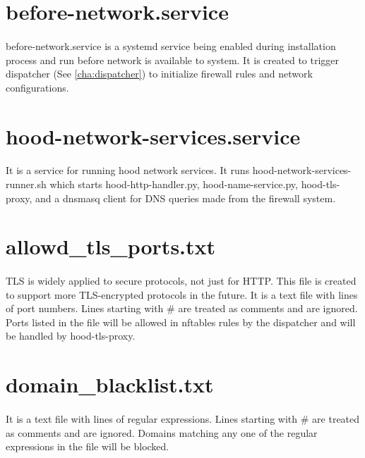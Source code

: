\documentclass[mscthesis]{usiinfthesis}
\begin{document}
\section{before-network.service}\label{sec:before-network-service}
\paragraph{}
before-network.service is a systemd service being enabled during installation process and run before network is available to system. It is created to trigger dispatcher (See \cref{cha:dispatcher}) to initialize firewall rules and network configurations.

\section{hood-network-services.service}\label{sec:hood-network-services.service}
\paragraph{}
It is a service for running hood network services. It runs hood-network-services-runner.sh which starts hood-http-handler.py, hood-name-service.py, hood-tls-proxy, and a dnsmasq client for DNS queries made from the firewall system.

\section{allowd\_tls\_ports.txt}\label{sec:allowed_tls_ports.txt}
\paragraph{}
TLS is widely applied to secure protocols, not just for HTTP. This file is created to support more TLS-encrypted protocols in the future. It is a text file with lines of port numbers. Lines starting with \# are treated as comments and are ignored. Ports listed in the file will be allowed in nftables rules by the dispatcher and will be handled by hood-tls-proxy.

\section{domain\_blacklist.txt}\label{sec:domain_blacklist.txt}
\paragraph{}
It is a text file with lines of regular expressions. Lines starting with \# are treated as comments and are ignored. Domains matching any one of the regular expressions in the file will be blocked.
\end{document}
